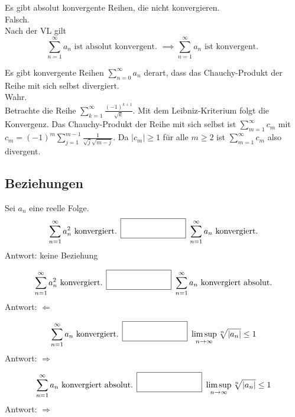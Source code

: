 \documentclass[parskip=full]{scrartcl}
\begin{document}
Es gibt absolut konvergente Reihen, die nicht konvergieren.\\
Falsch.\\
Nach der VL gilt
\begin{displaymath}
  \sum_{n = 1}^{\infty} a_n \text{ ist absolut konvergent. } \implies \sum_{n = 1}^{\infty} a_n \text{ ist konvergent. }
\end{displaymath}

Es gibt konvergente Reihen $\sum_{n = 0}^{\infty} a_n$ derart, dass das Chauchy-Produkt der Reihe mit sich selbst divergiert.\\
Wahr.\\
Betrachte die Reihe $\sum_{k = 1}^{\infty} \frac{(-1)^{k+1}}{\sqrt{k}}$.
Mit dem Leibniz-Kriterium folgt die Konvergenz.
Das Chauchy-Produkt der Reihe mit sich selbst ist $\sum_{m = 1}^{\infty} c_m$ mit $c_m = (-1)^m \sum_{j = 1}^{m - 1} \frac{1}{\sqrt{j} \sqrt{m-j}}$.
Da $|c_m| \geq 1$ für alle $m \geq 2$ ist $\sum_{m = 1}^{\infty} c_m$ also divergent.

\subsection{Beziehungen}
Sei $a_n$ eine reelle Folge.
\begin{displaymath} 
  \sum_{n = 1}^{\infty} a_n^2 \text{ konvergiert. } \fbox{\rule{1in}{0pt}\rule[-0.5ex]{0pt}{4ex}} \text{ } \sum_{n = 1}^{\infty} a_n \text{ konvergiert.}
\end{displaymath}
Antwort: keine Beziehung

\begin{displaymath}
  \sum_{n = 1}^{\infty} a_n^2 \text{ konvergiert. } \fbox{\rule{1in}{0pt}\rule[-0.5ex]{0pt}{4ex}} \text{ } \sum_{n = 1}^{\infty} a_n \text{ konvergiert absolut.}
\end{displaymath}
Antwort: $\Leftarrow$

\begin{displaymath}
  \sum_{n = 1}^{\infty} a_n \text{ konvergiert. } \fbox{\rule{1in}{0pt}\rule[-0.5ex]{0pt}{4ex}} \text{ } \limsup_{n \to \infty} \sqrt[n]{|a_n|} \leq 1
\end{displaymath}
Antwort: $\Rightarrow$

\begin{displaymath}
  \sum_{n = 1}^{\infty} a_n \text{ konvergiert absolut. } \fbox{\rule{1in}{0pt}\rule[-0.5ex]{0pt}{4ex}} \text{ } \limsup_{n \to \infty} \sqrt[n]{|a_n|} \leq 1
\end{displaymath}
Antwort: $\Rightarrow$
\end{document}
